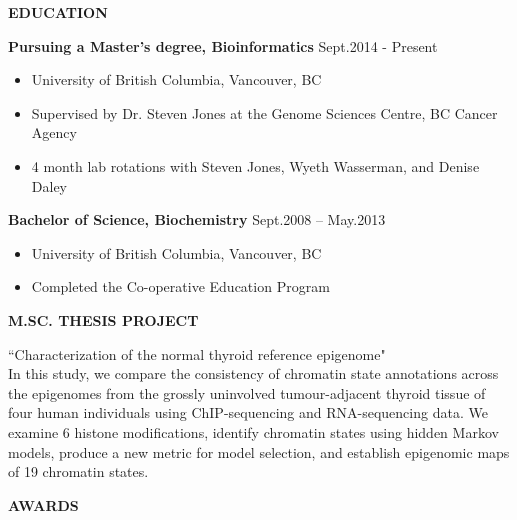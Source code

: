 \documentclass{res}
\renewcommand{\section}[1]{%
  \vspace{0.3in}%
  \centerline{\uppercase{\bf{#1}}}%
  \vspace{-6pt}}
\newcommand{\linehead}[2]{%
  {\bf #1} \hfill #2\\}
\begin{document}
\begin{resume}

\thispagestyle{empty} %

\section{Education}
\linehead{Pursuing a Master's degree, Bioinformatics}{Sept.2014 - Present}\vspace{-8pt}
\begin{itemize}
  \item University of British Columbia, Vancouver, BC
  \item Supervised by Dr. Steven Jones at the Genome Sciences Centre, BC Cancer Agency
  \item 4 month lab rotations with Steven Jones, Wyeth Wasserman, and Denise Daley
\end{itemize}

\linehead{Bachelor of Science, Biochemistry}{Sept.2008 -- May.2013}\vspace{-8pt}
\begin{itemize}
  \item University of British Columbia, Vancouver, BC
  \item Completed the Co-operative Education Program
\end{itemize}

\section{M.Sc. Thesis Project}
``Characterization of the normal thyroid reference epigenome"\\
In this study, we compare the consistency of chromatin state annotations across the epigenomes from the grossly uninvolved tumour-adjacent thyroid tissue of four human individuals using ChIP-sequencing and RNA-sequencing data. We examine 6 histone modifications, identify chromatin states using hidden Markov models, produce a new metric for model selection, and establish epigenomic maps of 19 chromatin states.

\section{Awards}


\end{resume}
\end{document}
